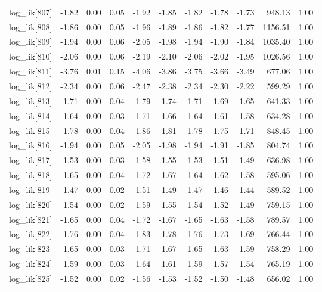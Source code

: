 \begin{table}[ht]
\begin{tabular}{rrrrrrrrrrr}
  log\_lik[807] & -1.82 & 0.00 & 0.05 & -1.92 & -1.85 & -1.82 & -1.78 & -1.73 & 948.13 & 1.00 \\ 
  log\_lik[808] & -1.86 & 0.00 & 0.05 & -1.96 & -1.89 & -1.86 & -1.82 & -1.77 & 1156.51 & 1.00 \\ 
  log\_lik[809] & -1.94 & 0.00 & 0.06 & -2.05 & -1.98 & -1.94 & -1.90 & -1.84 & 1035.40 & 1.00 \\ 
  log\_lik[810] & -2.06 & 0.00 & 0.06 & -2.19 & -2.10 & -2.06 & -2.02 & -1.95 & 1026.56 & 1.00 \\ 
  log\_lik[811] & -3.76 & 0.01 & 0.15 & -4.06 & -3.86 & -3.75 & -3.66 & -3.49 & 677.06 & 1.00 \\ 
  log\_lik[812] & -2.34 & 0.00 & 0.06 & -2.47 & -2.38 & -2.34 & -2.30 & -2.22 & 599.29 & 1.00 \\ 
  log\_lik[813] & -1.71 & 0.00 & 0.04 & -1.79 & -1.74 & -1.71 & -1.69 & -1.65 & 641.33 & 1.00 \\ 
  log\_lik[814] & -1.64 & 0.00 & 0.03 & -1.71 & -1.66 & -1.64 & -1.61 & -1.58 & 634.28 & 1.00 \\ 
  log\_lik[815] & -1.78 & 0.00 & 0.04 & -1.86 & -1.81 & -1.78 & -1.75 & -1.71 & 848.45 & 1.00 \\ 
  log\_lik[816] & -1.94 & 0.00 & 0.05 & -2.05 & -1.98 & -1.94 & -1.91 & -1.85 & 804.74 & 1.00 \\ 
  log\_lik[817] & -1.53 & 0.00 & 0.03 & -1.58 & -1.55 & -1.53 & -1.51 & -1.49 & 636.98 & 1.00 \\ 
  log\_lik[818] & -1.65 & 0.00 & 0.04 & -1.72 & -1.67 & -1.64 & -1.62 & -1.58 & 595.06 & 1.00 \\ 
  log\_lik[819] & -1.47 & 0.00 & 0.02 & -1.51 & -1.49 & -1.47 & -1.46 & -1.44 & 589.52 & 1.00 \\ 
  log\_lik[820] & -1.54 & 0.00 & 0.02 & -1.59 & -1.55 & -1.54 & -1.52 & -1.49 & 759.15 & 1.00 \\ 
  log\_lik[821] & -1.65 & 0.00 & 0.04 & -1.72 & -1.67 & -1.65 & -1.63 & -1.58 & 789.57 & 1.00 \\ 
  log\_lik[822] & -1.76 & 0.00 & 0.04 & -1.83 & -1.78 & -1.76 & -1.73 & -1.69 & 766.44 & 1.00 \\ 
  log\_lik[823] & -1.65 & 0.00 & 0.03 & -1.71 & -1.67 & -1.65 & -1.63 & -1.59 & 758.29 & 1.00 \\ 
  log\_lik[824] & -1.59 & 0.00 & 0.03 & -1.64 & -1.61 & -1.59 & -1.57 & -1.54 & 765.19 & 1.00 \\ 
  log\_lik[825] & -1.52 & 0.00 & 0.02 & -1.56 & -1.53 & -1.52 & -1.50 & -1.48 & 656.02 & 1.00 \\ 

\end{tabular}
\end{table}
